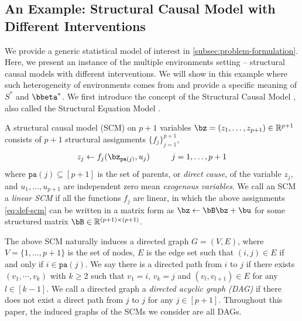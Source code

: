 \documentclass[10pt]{article}
\numberwithin{equation}{section}
\begin{document}
{\subsection{An Example: Structural Causal Model with Different Interventions}\label{subsec:causal}

We provide a generic statistical model of interest in \cref{subsec:problem-formulation}. 
Here, we present an instance of the multiple environments setting -- structural causal models with different interventions. We will show in this example where such heterogeneity of environments comes from and provide a specific meaning of $S^*$ and $\bbeta^*$. We first introduce the concept of the Structural Causal Model \citep{glymour2016causal}, also called the Structural Equation Model \citep{bollen1989structural}. 

A structural causal model (SCM) on $p+1$ variables $\bz = (z_1,\ldots, z_{p+1}) \in \mathbb{R}^{p+1}$ consists of $p+1$ structural assignments $\{f_j\}_{j=1}^{p+1}$,
\begin{align}
\label{eq:def-scm}
    z_j \gets f_j(\bz_{\mathtt{pa}(j)}, u_j) ~~~~~~~~ j = 1,\ldots, p+1
\end{align} where $\mathtt{pa}(j) \subseteq [p+1]$ is the set of parents, or \emph{direct cause}, of the variable $z_j$, and $u_1, \ldots, u_{p+1}$ are independent zero mean \emph{exogenous variables}. We call an SCM a \emph{linear SCM} if all the functions $f_j$ are linear, in which the above assignments \eqref{eq:def-scm} can be written in a matrix form as $\bz \gets \bB \bz + \bu$ for some structured matrix $\bB \in \mathbb{R}^{(p+1)\times (p+1)}$. 

The above SCM naturally induces a directed graph $G = (V, E)$, where $V = \{1,\ldots, p+1\}$ is the set of nodes, $E$ is the edge set such that $(i,j) \in E$ if and only if $i \in \mathtt{pa}(j)$. We say there is a directed path from $i$ to $j$ if there exists $(v_1,\cdots, v_k)$ with $k\ge 2$ such that $v_1=i$, $v_k=j$ and $(v_l, v_{l+1}) \in E$ for any $l\in [k-1]$. We call a directed graph a \emph{directed acyclic graph (DAG)} if there does not exist a direct path from $j$ to $j$ for any $j\in[p+1]$.  Throughout this paper, the induced graphs of the SCMs we consider are all DAGs. 


\begin{figure}[t]
    \centering

\end{figure}}
\end{document}
